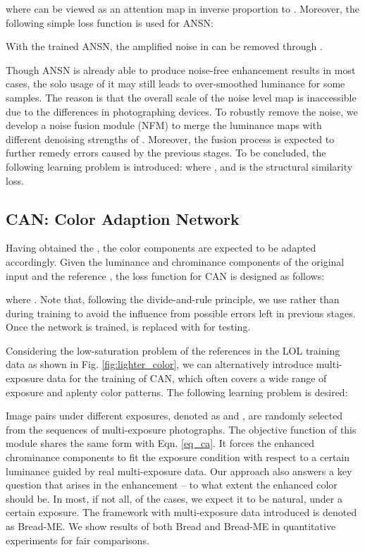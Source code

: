 \documentclass[10pt,twocolumn,letterpaper]{article}
\begin{document}
where  can be viewed as an attention map in inverse proportion to .  
Moreover, the following simple loss function is used for ANSN: 

With the trained ANSN, the amplified noise in  can be removed through .

Though ANSN is already able to produce noise-free enhancement results in most cases, the solo usage of it may still leads to over-smoothed luminance for some samples. The reason is that the overall scale of the noise level map is inaccessible due to the differences in photographing devices. To robustly remove the noise, we develop a noise fusion module (NFM) to merge the luminance maps  with  different denoising strengths of . Moreover, the fusion process is expected to further remedy errors caused by the previous stages. To be concluded, the following learning problem is introduced: 
where , and   is the structural similarity loss. 

\subsection{CAN: Color Adaption Network}

Having obtained the , the color components are expected to be adapted accordingly. Given the luminance and chrominance components of the original input  and the reference , the loss function for CAN is designed as follows: 

where  . Note that, following the divide-and-rule principle, we use  rather than  during training to avoid the influence from possible errors left in previous stages. Once the network is trained,  is replaced with  for testing.  

Considering the low-saturation problem of the references in the LOL \cite{DBLP:conf/bmvc/WeiWY018} training data as shown in Fig. \ref{fig:lighter_color}, we can alternatively introduce multi-exposure data for the training of CAN, which often covers a wide range of exposure and aplenty color patterns. The following learning problem is desired: 

Image pairs under different exposures, denoted as  and , are randomly selected from the sequences of multi-exposure photographs. The objective function of this module shares the same form with Eqn. \eqref{eq_ca}. It forces the enhanced chrominance components to fit the exposure condition with respect to a certain luminance guided by real multi-exposure data. Our approach also answers a key question that arises in the enhancement -- to what extent the enhanced color should be. In most, if not all, of the cases, we expect it to be natural, under a certain exposure. The framework with multi-exposure data introduced is denoted as Bread-ME. We show results of both Bread and Bread-ME in quantitative experiments for fair comparisons. 
\end{document}
